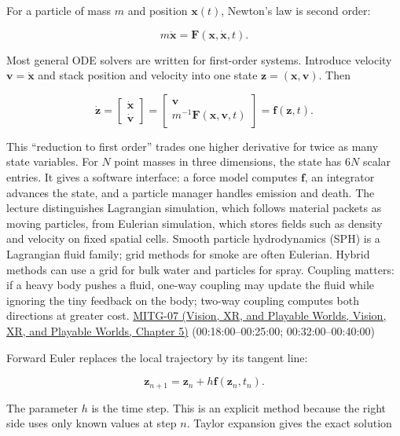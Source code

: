 For a particle of mass \(m\) and position \(\boldsymbol{x}(t)\), Newton's law is second order:

\[
m\ddot{\boldsymbol{x}}=\boldsymbol{F}(\boldsymbol{x},\dot{\boldsymbol{x}},t).
\]

Most general ODE solvers are written for first-order systems. Introduce velocity \(\boldsymbol{v}=\dot{\boldsymbol{x}}\) and stack position and velocity into one state \(\boldsymbol{z}=(\boldsymbol{x},\boldsymbol{v})\). Then

\[
\dot{\boldsymbol{z}}=
\begin{bmatrix}\dot{\boldsymbol{x}}\\\dot{\boldsymbol{v}}\end{bmatrix}
=\begin{bmatrix}\boldsymbol{v}\\m^{-1}\boldsymbol{F}(\boldsymbol{x},\boldsymbol{v},t)\end{bmatrix}
=\boldsymbol{f}(\boldsymbol{z},t).
\]

This ``reduction to first order'' trades one higher derivative for twice as many state variables. For \(N\) point masses in three dimensions, the state has \(6N\) scalar entries. It gives a software interface: a force model computes \(\boldsymbol{f}\), an integrator advances the state, and a particle manager handles emission and death. The lecture distinguishes Lagrangian simulation, which follows material packets as moving particles, from Eulerian simulation, which stores fields such as density and velocity on fixed spatial cells. Smooth particle hydrodynamics (SPH) is a Lagrangian fluid family; grid methods for smoke are often Eulerian. Hybrid methods can use a grid for bulk water and particles for spray. Coupling matters: if a heavy body pushes a fluid, one-way coupling may update the fluid while ignoring the tiny feedback on the body; two-way coupling computes both directions at greater cost. \href{../07-Vision-XR-and-Playable-Worlds/main.pdf\#nameddest=04-visual-computing-ii-ch036-mitg-07---particle-systems}{MITG-07 (Vision, XR, and Playable Worlds, Vision, XR, and Playable Worlds, Chapter 5)} (00:18:00--00:25:00; 00:32:00--00:40:00)

Forward Euler replaces the local trajectory by its tangent line:

\[
\boldsymbol{z}_{n+1}=\boldsymbol{z}_n+h\boldsymbol{f}(\boldsymbol{z}_n,t_n).
\]

The parameter \(h\) is the time step. This is an explicit method because the right side uses only known values at step \(n\). Taylor expansion gives the exact solution

